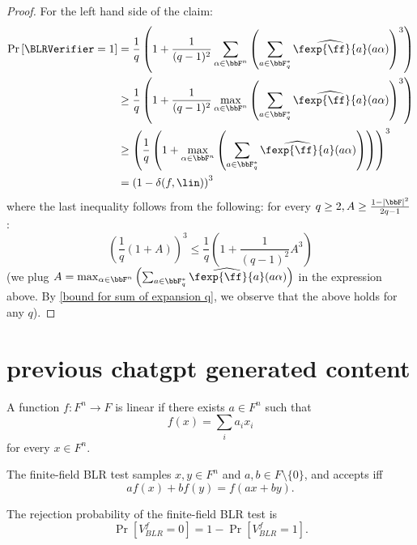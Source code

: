 \begin{proof}
For the left hand side of the claim:
\begin{align*}
\Pr\left[\BLRVerifier=1 \right] &= \frac{1}{q}\left(1+\frac{1}{(q-1)^2}\sum_{\alpha\in\bbF^n}\left(\sum_{a\in\bbF_q^{*}}\widehat{\fexp{\ff}{a}}(a\alpha)\right)^3\right)\\
&\ge  \frac{1}{q}\left(1+\frac{1}{(q-1)^2}\max_{\alpha\in\bbF^n}\left(\sum_{a\in\bbF_q^{*}}\widehat{\fexp{\ff}{a}}(a\alpha)\right)^3\right)\\
&\ge  \left(\frac{1}{q}\left(1+\max_{\alpha\in\bbF^n}\left(\sum_{a\in\bbF_q^{*}}\widehat{\fexp{\ff}{a}}(a\alpha)\right)\right)\right)^3\\
&=  \left(1-\delta(f,\lin)\right)^3
\end{align*}
where the last inequality follows from the following: for every $q\geq 2, A\ge \frac{1-|\bbF|^2}{2q-1}$:
\[
\left(\frac{1}{q}\left(1+A\right)\right)^3\le
\frac{1}{q}\left(1+\frac{1}{(q-1)^2}A^3\right)
\]
(we plug $A=\max_{\alpha\in\bbF^n}\left(\sum_{a\in\bbF_q^{*}}\widehat{\fexp{\ff}{a}}(a\alpha)\right)$ in the expression above. By \cref{bound for sum of expansion q}, we observe that the above holds for any $q$).

\end{proof}





\section{previous chatgpt generated content}
\begin{definition}
    \label{def:ff-linear}
    A function $f : F^n \to F$ is linear if there exists
    $a \in F^n$ such that
    \[
        f(x) = \sum_i a_i x_i
    \]
    for every $x \in F^n$.
\end{definition}

\begin{definition}
    \label{def:ff-blr-test}
    The finite-field BLR test samples $x,y \in F^n$ and
  $a,b \in F \setminus \{0\}$, and accepts iff
  \[
    a f(x) + b f(y) = f(ax + by).
  \]
\end{definition}

\begin{definition}
    \label{def:ff-blr-reject-prob}
    The rejection probability of the finite-field BLR test is
  \[
    \Pr[V_{BLR}^f = 0] = 1 - \Pr[V_{BLR}^f = 1].
  \]
\end{definition}

